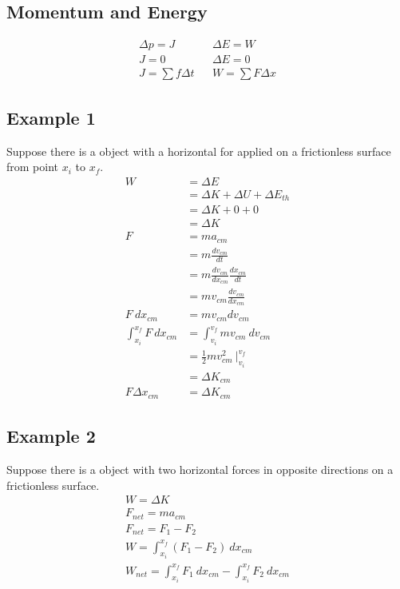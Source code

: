 \documentclass{article}
\theoremstyle{mytheoremstyle}
\theoremstyle{mytheoremstyle}
\theoremstyle{myproblemstyle}
\begin{document}
    \subsection*{Momentum and Energy}

    \begin{align*}
        \Delta p = J && \Delta E = W \\
        J=0 && \Delta E = 0 \\
        J=\sum f \Delta t && W = \sum F \Delta x
    \end{align*}

    \subsection*{Example 1}
    Suppose there is a object with a horizontal for applied on a frictionless
    surface from point $x_i$ to $x_f$.
    \begin{align*}
        W &= \Delta E \\
        &= \Delta K + \Delta U + \Delta E_{th} \\
        &= \Delta K + 0 + 0 \\
        &= \Delta K \\
        F &= ma_{cm} \\
        &= m \frac{dv_{cm}}{dt} \\
        &= m \frac{dv_{cm}}{dx_{cm}} \frac{dx_{cm}}{dt} \\
        &= m v_{cm} \frac{dv_{cm}}{dx_{cm}} \\
        F\ dx_{cm}&= mv_{cm} dv_{cm} \\
        \int_{x_i}^{x_f} F \ dx_{cm} &= \int_{v_i}^{v_f} mv_{cm} \ dv_{cm} \\
        &= \frac{1}{2} mv_{cm}^2 \ \Big|_{v_i}^{v_f} \\
        &= \Delta K_{cm} \\
        F\Delta x_{cm} &= \Delta K_{cm}
    \end{align*}

    \subsection*{Example 2}
    Suppose there is a object with two horizontal forces in opposite directions
    on a frictionless surface.
    \begin{align*}
        W = \Delta K \\
        F_{net} = m a_{cm} \\
        F_{net} = F_1 - F_2 \\
        W = \int_{x_i}^{x_f} (F_1-F_2) \ dx_{cm} \\
        W_{net} = \int_{x_i}^{x_f} F_1 \ dx_{cm}
        -  \int_{x_i}^{x_f} F_2 \ dx_{cm}
    \end{align*}
\end{document}
